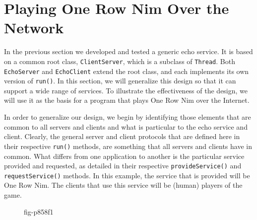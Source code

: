 \section{Playing One Row Nim Over the Network}
\label{playing-one-row-nim-overthe-network}

\noindent In the previous section we developed and tested a generic echo service.  
It is based on a common root class, {\tt ClientServer}, which is a subclass of
{\tt Thread}.  Both {\tt EchoServer} and {\tt EchoClient} extend the
root class, and each implements its own version of {\tt run()}. In
this section, we will generalize this design so that it can support a wide
range of services.  To illustrate the effectiveness of the design, we
will use it as the basis for a program that plays One Row Nim over the
Internet.

In order to generalize our design, we begin by identifying
those elements that are common to all
servers and clients and what is particular to the echo service and
client.  Clearly, the general server and client protocols that are defined
here in their respective {\tt run()} methods, are something that all
servers and clients have in common.  What differs from one application
to another is the particular service provided and requested, as
detailed in their respective {\tt provideService()} and {\tt
requestService()} methods. In this example, the service that is
provided will be One Row Nim.  The clients that use this service will
be (human) players of the game.

\begin{figure}[bt]
{fig-p858f1}
\end{figure}

